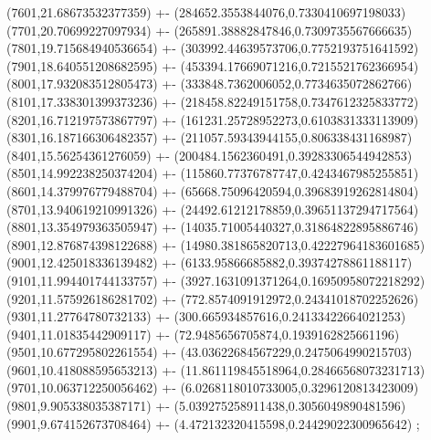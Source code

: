 {(7601,21.68673532377359) +- (284652.3553844076,0.7330410697198033)
(7701,20.70699227097934) +- (265891.38882847846,0.7309735567666635)
(7801,19.715684940536654) +- (303992.44639573706,0.7752193751641592)
(7901,18.640551208682595) +- (453394.17669071216,0.7215521762366954)
(8001,17.932083512805473) +- (333848.7362006052,0.7734635072862766)
(8101,17.338301399373236) +- (218458.82249151758,0.7347612325833772)
(8201,16.712197573867797) +- (161231.25728952273,0.6103831333113909)
(8301,16.187166306482357) +- (211057.59343944155,0.806338431168987)
(8401,15.56254361276059) +- (200484.1562360491,0.39283306544942853)
(8501,14.992238250374204) +- (115860.77376787747,0.4243467985255851)
(8601,14.379976779488704) +- (65668.75096420594,0.39683919262814804)
(8701,13.940619210991326) +- (24492.61212178859,0.39651137294717564)
(8801,13.354979363505947) +- (14035.71005440327,0.31864822895886746)
(8901,12.876874398122688) +- (14980.381865820713,0.42227964183601685)
(9001,12.425018336139482) +- (6133.95866685882,0.39374278861188117)
(9101,11.994401744133757) +- (3927.1631091371264,0.16950958072218292)
(9201,11.575926186281702) +- (772.8574091912972,0.24341018702252626)
(9301,11.27764780732133) +- (300.665934857616,0.24133422664021253)
(9401,11.01835442909117) +- (72.9485656705874,0.1939162825661196)
(9501,10.677295802261554) +- (43.03622684567229,0.2475064990215703)
(9601,10.418088595653213) +- (11.861119845518964,0.28466568073231713)
(9701,10.063712250056462) +- (6.0268118010733005,0.3296120813423009)
(9801,9.905338035387171) +- (5.039275258911438,0.3056049890481596)
(9901,9.674152673708464) +- (4.472132320415598,0.24429022300965642)
};

